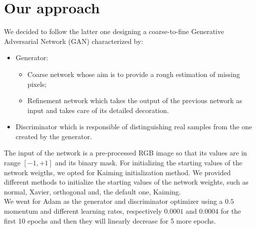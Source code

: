 \documentclass[10pt,twocolumn,letterpaper]{article}
\begin{document}
\section{Our approach}
We decided to follow the latter one designing a coarse-to-fine Generative Adversarial Network (GAN) characterized by:
\begin{itemize}
	\item
	Generator:
	\begin{itemize}
		\item 
		Coarse network whose aim is to provide a rough estimation of missing pixels;
		\item
		Refinement network which takes the output of the previous network as input and takes care of its detailed decoration.
	\end{itemize}
	\item
	Discriminator which is responsible of distinguishing real samples from the one created by the generator.
\end{itemize}
The input of the network is a pre-processed RGB image so that its values are in range \([-1,+1]\) and its binary mask.
For initializing the starting values of the network weigths, we opted for Kaiming initialization method.
We provided different methods to initialize the starting values of the network weights, such as normal, Xavier, orthogonal and, the default one, Kaiming.
\\
We went for Adam as the generator and discriminator optimizer using a \(0.5\) momentum and different learning rates, respectively \(0.0001\) and \(0.0004\) for the first 10 epochs and then they will linearly decrease for 5 more epochs.
\end{document}
